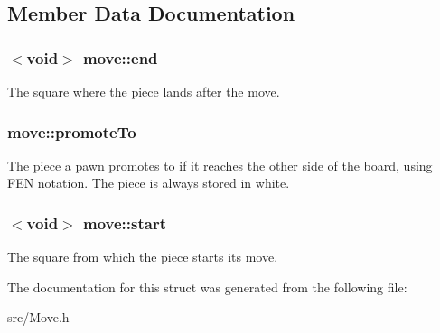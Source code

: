 \subsection{Member Data Documentation}
\subsubsection[{\texorpdfstring{end}{end}}]{$<$void$>$ move\+::end}\hypertarget{structmove_a205ae16ec975ed71eb4233bb38d21a75}{}\label{structmove_a205ae16ec975ed71eb4233bb38d21a75}
The square where the piece lands after the move. 
\subsubsection[{\texorpdfstring{promote\+To}{promoteTo}}]{ move\+::promote\+To}\hypertarget{structmove_a87fc4fc521c961cce03613dcb6cd0c6b}{}\label{structmove_a87fc4fc521c961cce03613dcb6cd0c6b}
The piece a pawn promotes to if it reaches the other side of the board, using F\+EN notation. The piece is always stored in white. 
\subsubsection[{\texorpdfstring{start}{start}}]{$<$void$>$ move\+::start}\hypertarget{structmove_a3f8a82f7c7bc55f55874026ac254cd85}{}\label{structmove_a3f8a82f7c7bc55f55874026ac254cd85}
The square from which the piece starts its move. 

The documentation for this struct was generated from the following file\+:\begin{DoxyCompactItemize}
\item 
src/Move.\+h\end{DoxyCompactItemize}
